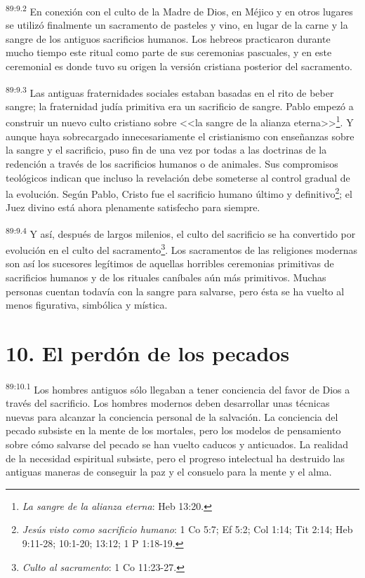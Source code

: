 \documentclass[twoside, 11pt]{book}
\begin{document}
\par
\textsuperscript{89:9.2} En conexión con el culto de la Madre de Dios, en Méjico y en otros lugares se utilizó finalmente un sacramento de pasteles y vino, en lugar de la carne y la sangre de los antiguos sacrificios humanos. Los hebreos practicaron durante mucho tiempo este ritual como parte de sus ceremonias pascuales, y en este ceremonial es donde tuvo su origen la versión cristiana posterior del sacramento.

\par
\textsuperscript{89:9.3} Las antiguas fraternidades sociales estaban basadas en el rito de beber sangre; la fraternidad judía primitiva era un sacrificio de sangre. Pablo empezó a construir un nuevo culto cristiano sobre <<la sangre de la alianza eterna>>\footnote{\textit{La sangre de la alianza eterna}: Heb 13:20.}. Y aunque haya sobrecargado innecesariamente el cristianismo con enseñanzas sobre la sangre y el sacrificio, puso fin de una vez por todas a las doctrinas de la redención a través de los sacrificios humanos o de animales. Sus compromisos teológicos indican que incluso la revelación debe someterse al control gradual de la evolución. Según Pablo, Cristo fue el sacrificio humano último y definitivo\footnote{\textit{Jesús visto como sacrificio humano}: 1 Co 5:7; Ef 5:2; Col 1:14; Tit 2:14; Heb 9:11-28; 10:1-20; 13:12; 1 P 1:18-19.}; el Juez divino está ahora plenamente satisfecho para siempre.

\par
\textsuperscript{89:9.4} Y así, después de largos milenios, el culto del sacrificio se ha convertido por evolución en el culto del sacramento\footnote{\textit{Culto al sacramento}: 1 Co 11:23-27.}. Los sacramentos de las religiones modernas son así los sucesores legítimos de aquellas horribles ceremonias primitivas de sacrificios humanos y de los rituales caníbales aún más primitivos. Muchas personas cuentan todavía con la sangre para salvarse, pero ésta se ha vuelto al menos figurativa, simbólica y mística.

\section*{10. El perdón de los pecados}
\par
\textsuperscript{89:10.1} Los hombres antiguos sólo llegaban a tener conciencia del favor de Dios a través del sacrificio. Los hombres modernos deben desarrollar unas técnicas nuevas para alcanzar la conciencia personal de la salvación. La conciencia del pecado subsiste en la mente de los mortales, pero los modelos de pensamiento sobre cómo salvarse del pecado se han vuelto caducos y anticuados. La realidad de la necesidad espiritual subsiste, pero el progreso intelectual ha destruido las antiguas maneras de conseguir la paz y el consuelo para la mente y el alma.
\end{document}
